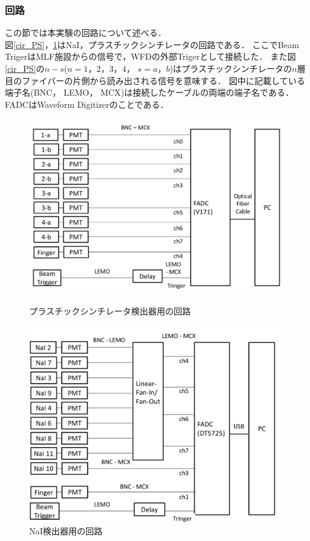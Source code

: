 \subsubsection{回路}
この節では本実験の回路について述べる．\\
図\ref{cir_PS}，\ref{cir_nai}はNaI，プラスチックシンチレータの回路である．
ここでBeam TrigerはMLF施設からの信号で，WFDの外部Trigerとして接続した．
また図\ref{cir_PS}の$n-s$($n=1，2，3，4$， $s=a，b$)はプラスチックシンチレータの$n$層目のファイバーの片側から読み出される信号を意味する．
図中に記載している端子名(BNC， LEMO， MCX)は接続したケーブルの両端の端子名である．FADCはWaveform Digitizerのことである．
\begin{figure}[H]
  \begin{minipage}{0.45\hsize}
    \begin{center}
      \includegraphics[width=1\textwidth]{figure/tajima/circuit_ps_2.png}
      \caption{プラスチックシンチレータ検出器用の回路}
      \label{cir_PS}
    \end{center}
  \end{minipage}
  \hfill
  \begin{minipage}{0.45\hsize}
    \begin{center}
      \includegraphics[width=1\textwidth]{figure/tajima/circuit_nai.png}
      \caption{NaI検出器用の回路}
      \label{cir_nai}
    \end{center}
  \end{minipage}
\end{figure}
